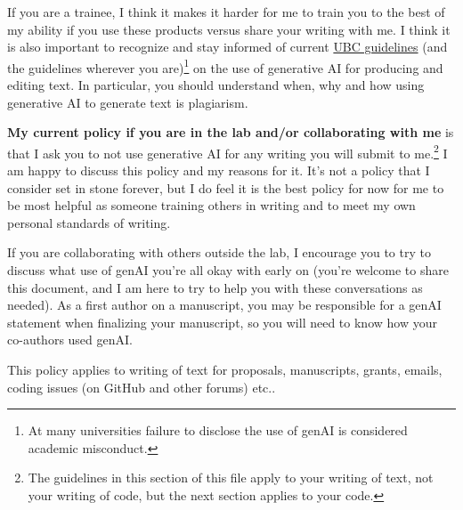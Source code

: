 \documentclass[11pt]{article}
\begin{document}
If you are a trainee, I think it makes it harder for me to train you to the best of my ability if you use these products versus share your writing with me. I think it is also important to recognize and stay informed of current \href{http://grad.ubc.ca/current-students/student-responsibilities/use-generative-ai}{UBC guidelines} (and the guidelines wherever you are)\footnote[3]{At many universities failure to disclose the use of genAI is considered academic misconduct.}
 on the use of generative AI for producing and editing text. In particular, you should understand when, why and how using generative AI to generate text is plagiarism.
 
{\bf My current policy if you are in the lab and/or collaborating with me} is that I ask you to not use generative AI for any writing you will submit to me.\footnote[4]{The guidelines in this section of this file apply to your writing of text, not your writing of code, but the next section applies to your code.} I am happy to discuss this policy and my reasons for it. It's not a policy that I consider set in stone forever, but I do feel it is the best policy for now for me to be most helpful as someone training others in writing and to meet my own personal standards of writing. 

If you are collaborating with others outside the lab, I encourage you to try to discuss what use of genAI you're all okay with early on (you're welcome to share this document, and I am here to try to help you with these conversations as needed). As a first author on a manuscript, you may be responsible for a genAI statement when finalizing your manuscript, so you will need to know how your co-authors used genAI. 

This policy applies to writing of text for proposals, manuscripts, grants, emails, coding issues (on GitHub and other forums) etc..
\end{document}
